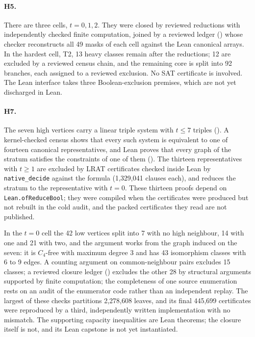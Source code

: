 \documentclass{anvil-paper}
\newcommand{\repobase}{https://github.com/rjwalters/lean-genius/blob/erdos85/integration}
\newcommand{\repofile}[2]{\href{\repobase/#1}{\lean{#2}}}
\newcommand{\rp}{research/problems/erdos-85-wip-01}
\theoremstyle{definition}
\begin{document}
\paragraph{H5.} There are three cells, $t=0,1,2$. They were closed by reviewed reductions with independently checked finite computation, joined by a reviewed ledger (\repofile{\rp/q7_h5_closure_ledger/README.md}{q7_h5_closure_ledger}) whose checker reconstructs all 49 masks of each cell against the Lean canonical arrays. In the hardest cell, T2, 13 heavy classes remain after the reductions; 12 are excluded by a reviewed census chain, and the remaining core is split into 92 branches, each assigned to a reviewed exclusion. No SAT certificate is involved. The Lean interface  takes three Boolean-exclusion premises, which are not yet discharged in Lean.

\paragraph{H7.} The seven high vertices carry a linear triple system with $t\le 7$ triples (). A kernel-checked census shows that every such system is equivalent to one of fourteen canonical representatives, and Lean proves that every graph of the stratum satisfies the constraints of one of them (). The thirteen representatives with $t\ge 1$ are excluded by LRAT certificates checked inside Lean by \texttt{native\_decide} against the formula  (1,329,041 clauses each), and  reduces the stratum to the representative with $t=0$. These thirteen proofs depend on \texttt{Lean.ofReduceBool}; they were compiled when the certificates were produced but not rebuilt in the cold audit, and the packed certificates they read are not published.

In the $t=0$ cell the 42 low vertices split into 7 with no high neighbour, 14 with one and 21 with two, and the argument works from the graph induced on the seven: it is $C_4$-free with maximum degree 3 and has 43 isomorphism classes with 6 to 9 edges. A counting argument on common-neighbour pairs excludes 15 classes; a reviewed closure ledger (\repofile{\rp/H7_CLOSURE_20260915.md}{H7_CLOSURE_20260915.md}) excludes the other 28 by structural arguments supported by finite computation; the completeness of one source enumeration rests on an audit of the enumerator code rather than an independent replay. The largest of these checks partitions 2,278,608 leaves, and its final 445,699 certificates were reproduced by a third, independently written implementation with no mismatch. The supporting capacity inequalities are Lean theorems; the closure itself is not, and its Lean capstone  is not yet instantiated.
\end{document}
